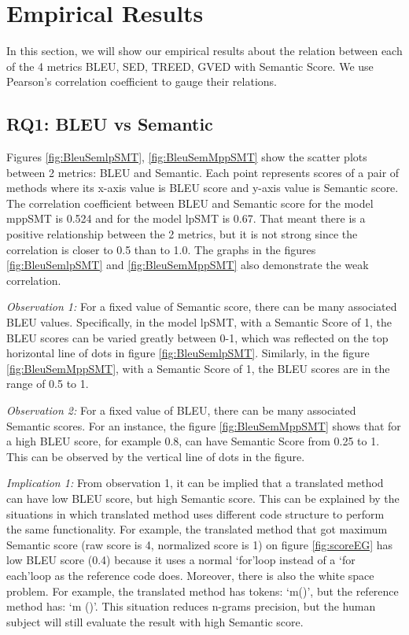 \section{Empirical Results}
In this section, we will show our empirical results about the relation between each of the 4 metrics BLEU, SED, TREED, GVED with Semantic Score. We use Pearson\rq s correlation coefficient to gauge their relations. 
\subsection{RQ1: BLEU vs Semantic}
Figures \ref{fig:BleuSemlpSMT}, \ref{fig:BleuSemMppSMT}  show the scatter plots between 2 metrics: BLEU and Semantic. Each point represents scores of a pair of methods where its x-axis value is BLEU score and y-axis value is Semantic score.
The correlation coefficient between BLEU and Semantic score for the model mppSMT is 0.524 and for the model lpSMT is 0.67. That meant there is a positive relationship between the 2 metrics, but it is not strong since the correlation is closer to 0.5 than to 1.0. The graphs in the figures \ref{fig:BleuSemlpSMT} and \ref{fig:BleuSemMppSMT}  also demonstrate the weak correlation.

\emph{Observation 1:} For a fixed value of Semantic score, there can be many associated BLEU values. Specifically, in the model lpSMT, with a Semantic Score of 1, the BLEU scores can be varied greatly between 0-1, which was reflected on the top horizontal line of dots in figure \ref{fig:BleuSemlpSMT}. Similarly, in the figure \ref{fig:BleuSemMppSMT}, with a Semantic Score of 1, the BLEU scores are in the range of 0.5 to 1. 

\emph{Observation 2:} For a fixed value of BLEU, there can be many associated Semantic scores. For an instance, the figure \ref{fig:BleuSemMppSMT} shows that for a high BLEU score, for example 0.8, can have Semantic Score from 0.25 to 1. This can be observed by the vertical line of dots in the figure. 

\emph{Implication 1: }From observation 1, it can be implied that a translated method can have low BLEU score, but high Semantic score. This can be explained by the situations in which translated method uses different code structure to perform the same functionality. For example, the translated method that got maximum Semantic score (raw score is 4, normalized score is 1) on figure \ref{fig:scoreEG} has low BLEU score (0.4) because it uses a normal \lq for\rq  loop instead of a \lq for each\rq  loop as the reference code does. Moreover, there is also the white space problem. For example, the translated method has tokens: \lq m()\rq, but the reference method has: \lq m ()\rq. This situation reduces n-grams precision, but the human subject will still evaluate the result with high Semantic score.     

